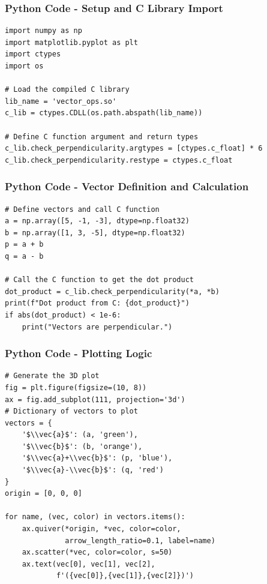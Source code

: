 \documentclass{beamer}
\begin{document}
\begin{frame}[fragile]
    \frametitle{Python Code - Setup and C Library Import}
    \lstset{language=Python}
    \begin{lstlisting}
import numpy as np
import matplotlib.pyplot as plt
import ctypes
import os

# Load the compiled C library
lib_name = 'vector_ops.so'
c_lib = ctypes.CDLL(os.path.abspath(lib_name))

# Define C function argument and return types
c_lib.check_perpendicularity.argtypes = [ctypes.c_float] * 6
c_lib.check_perpendicularity.restype = ctypes.c_float
    \end{lstlisting}
\end{frame}

\begin{frame}[fragile]
    \frametitle{Python Code - Vector Definition and Calculation}
    \lstset{language=Python}
    \begin{lstlisting}
# Define vectors and call C function
a = np.array([5, -1, -3], dtype=np.float32)
b = np.array([1, 3, -5], dtype=np.float32)
p = a + b
q = a - b

# Call the C function to get the dot product
dot_product = c_lib.check_perpendicularity(*a, *b)
print(f"Dot product from C: {dot_product}")
if abs(dot_product) < 1e-6:
    print("Vectors are perpendicular.")
    \end{lstlisting}
\end{frame}

\begin{frame}[fragile]
    \frametitle{Python Code - Plotting Logic}
    \lstset{language=Python}
    \begin{lstlisting}
# Generate the 3D plot
fig = plt.figure(figsize=(10, 8))
ax = fig.add_subplot(111, projection='3d')
# Dictionary of vectors to plot
vectors = {
    '$\\vec{a}$': (a, 'green'),
    '$\\vec{b}$': (b, 'orange'),
    '$\\vec{a}+\\vec{b}$': (p, 'blue'),
    '$\\vec{a}-\\vec{b}$': (q, 'red')
}
origin = [0, 0, 0]

for name, (vec, color) in vectors.items():
    ax.quiver(*origin, *vec, color=color, 
              arrow_length_ratio=0.1, label=name)
    ax.scatter(*vec, color=color, s=50)
    ax.text(vec[0], vec[1], vec[2], 
            f'({vec[0]},{vec[1]},{vec[2]})')
    \end{lstlisting}
\end{frame}
\end{document}
